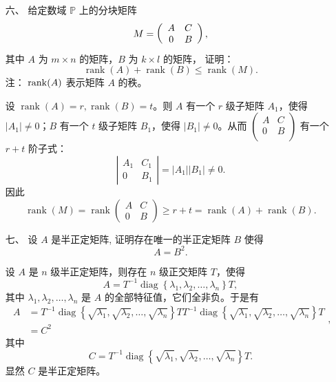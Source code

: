 \begin{enumerate}[1~]
\item[六、]
给定数域 $\mathbb{P}$ 上的分块矩阵 
$$
M = \left( \begin{array} { c c } { A } & { C } \\ { 0 } & { B } \end{array} \right),
$$
其中 $A$ 为 $m \times n$ 的矩阵，$B$ 为 $k \times l$ 的矩阵， 证明：\[
\operatorname { rank } ( A ) + \operatorname { rank } ( B ) \leq \operatorname { rank } ( M ).
\]
注： ${\rm rank}(A)$ 表示矩阵 $A$ 的秩。
\begin{solution}
设 $\operatorname{rank}(A)=r, \operatorname{rank}(B)=t$。则 $A$ 有一个 $r$ 级子矩阵 $A_1$，使得 $|A_1|\ne 0$；$B$ 有一个 $t$ 级子矩阵 $B_1$，使得 $|B_1| \ne 0$。从而 $\left( \begin{smallmatrix}
	A&		C\\
	0&		B\\
\end{smallmatrix} \right) $ 有一个 $r + t$ 阶子式：\[
\left| \begin{array}{cc}{A_{1}} & {C_{1}} \\ {0} & {B_{1}}\end{array}\right|=\left|A_{1}\right|\left|B_{1}\right| \ne 0.
\]
因此 \[
\operatorname{rank} (M) = \operatorname{rank} \left( \begin{array}{cc}{A} & {C} \\ {0} & {B}\end{array}\right) \ge r+t=\operatorname{rank}(A)+\operatorname{rank}(B).
\]
\end{solution}

\item[七、]
设 $A$ 是半正定矩阵, 证明存在唯一的半正定矩阵 $B$ 使得\[
A = B ^ { 2 }.
\]
\begin{solution}
设 $ A $ 是 $ n $ 级半正定矩阵，则存在 $ n $ 级正交矩阵 $ T $，使得 \[
A = T ^ { - 1 } \operatorname { diag } \left\{ \lambda _ { 1 } , \lambda _ { 2 } , \dots , \lambda _ { n } \right\} T,
\]
其中 $\lambda _ { 1 } , \lambda _ { 2 } , \dots , \lambda _ { n }$ 是 $ A $ 的全部特征值，它们全非负。于是有\[
\begin{aligned} A & = T ^ { - 1 } \operatorname { diag } \left\{ \sqrt { \lambda _ { 1 } } , \sqrt { \lambda _ { 2 } } , \dots , \sqrt { \lambda _ { n } } \right\} T T ^ { - 1 } \operatorname { diag } \left\{ \sqrt { \lambda _ { 1 } } , \sqrt { \lambda _ { 2 } } , \dots , \sqrt { \lambda _ { n } } \right\} T \\ & = C ^ { 2 } \end{aligned},
\]
其中\[
C = T ^ { - 1 } \operatorname { diag } \left\{ \sqrt { \lambda _ { 1 } } , \sqrt { \lambda _ { 2 } } , \dots , \sqrt { \lambda _ { n } } \right\} T.
\]
显然 $ C $ 是半正定矩阵。
\end{solution}


\end{enumerate}
